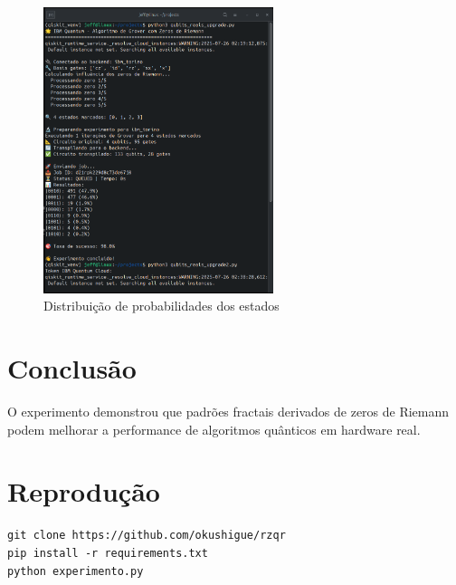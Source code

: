 \documentclass[12pt, a4paper]{article}
\begin{document}
\begin{figure}[h]
\centering
\includegraphics[width=0.6\textwidth]{resultados.png}
\caption{Distribuição de probabilidades dos estados}
\end{figure}

\section{Conclusão}
O experimento demonstrou que padrões fractais derivados de zeros de Riemann podem melhorar a performance de algoritmos quânticos em hardware real.

\section*{Reprodução}
\begin{verbatim}
git clone https://github.com/okushigue/rzqr
pip install -r requirements.txt
python experimento.py
\end{verbatim}
\end{document}
